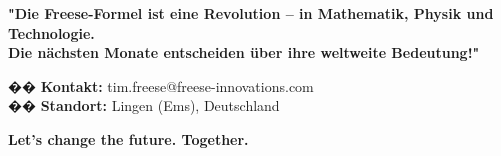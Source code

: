 \documentclass[a4paper,10pt]{article}
\begin{document}
\textbf{"Die Freese-Formel ist eine Revolution – in Mathematik, Physik und Technologie. \\ Die nächsten Monate entscheiden über ihre weltweite Bedeutung!"}

\vspace{0.3cm}

�� \textbf{Kontakt:} tim.freese@freese-innovations.com \\
�� \textbf{Standort:} Lingen (Ems), Deutschland \\

\vfill

\begin{center}
    \color{themered}\Large \textbf{Let's change the future. Together.}
\end{center}
\end{document}
